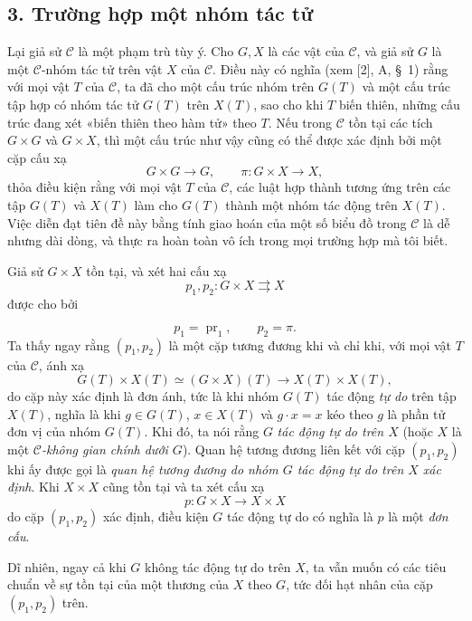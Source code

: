 \subsection*{3. Trường hợp một nhóm tác tử}

Lại giả sử $\mathcal C$ là một phạm trù tùy ý. Cho $G,X$ là các vật của
$\mathcal C$, và giả sử $G$ là một $\mathcal C$-nhóm tác tử trên vật $X$ của
$\mathcal C$. Điều này có nghĩa (xem [2], A, \S~1) rằng với mọi vật $T$ của
$\mathcal C$, ta đã cho một cấu trúc nhóm trên $G(T)$ và một cấu trúc tập hợp
có nhóm tác tử $G(T)$ trên $X(T)$, sao cho khi $T$ biến thiên, những cấu trúc
đang xét «biến thiên theo hàm tử» theo $T$. Nếu trong $\mathcal C$ tồn tại các
tích $G\times G$ và $G\times X$, thì một cấu trúc như vậy cũng có thể được
xác định bởi một cặp cấu xạ
\[
  G\times G\longrightarrow G,
  \qquad \pi:G\times X\longrightarrow X,
\]
thỏa điều kiện rằng với mọi vật $T$ của $\mathcal C$, các luật hợp thành tương
ứng trên các tập $G(T)$ và $X(T)$ làm cho $G(T)$ thành một nhóm tác động trên
$X(T)$. Việc diễn đạt tiên đề này bằng tính giao hoán của một số biểu đồ trong
$\mathcal C$ là dễ nhưng dài dòng, và thực ra hoàn toàn vô ích trong mọi
trường hợp mà tôi biết.

Giả sử $G\times X$ tồn tại, và xét hai cấu xạ
\[
  p_1,p_2:G\times X\rightrightarrows X
\]
được cho bởi

\[
  p_1=\operatorname{pr}_1,\qquad p_2=\pi.
\]
Ta thấy ngay rằng $(p_1,p_2)$ là một cặp tương đương khi và chỉ khi, với mọi
vật $T$ của $\mathcal C$, ánh xạ
\[
  G(T)\times X(T)\simeq(G\times X)(T)
  \longrightarrow X(T)\times X(T),
\]
do cặp này xác định là đơn ánh, tức là khi nhóm $G(T)$ tác động
\emph{tự do} trên tập $X(T)$, nghĩa là khi $g\in G(T)$, $x\in X(T)$ và
$g\cdot x=x$ kéo theo $g$ là phần tử đơn vị của nhóm $G(T)$. Khi đó, ta nói
rằng $G$ \emph{tác động tự do trên $X$} (hoặc $X$ là một
\emph{$\mathcal C$-không gian chính dưới $G$}). Quan hệ tương đương liên kết
với cặp $(p_1,p_2)$ khi ấy được gọi là \emph{quan hệ tương đương do nhóm $G$
tác động tự do trên $X$ xác định}. Khi $X\times X$ cũng tồn tại và ta xét cấu
xạ
\[
  p:G\times X\longrightarrow X\times X
\]
do cặp $(p_1,p_2)$ xác định, điều kiện $G$ tác động tự do có nghĩa là $p$ là
một \emph{đơn cấu}.

Dĩ nhiên, ngay cả khi $G$ không tác động tự do trên $X$, ta vẫn muốn có các
tiêu chuẩn về sự tồn tại của một thương của $X$ theo $G$, tức đối hạt nhân của
cặp $(p_1,p_2)$ trên.

